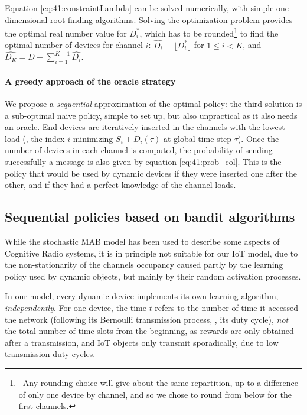 Equation \eqref{eq:41:constraintLambda} can be solved numerically, with simple one-dimensional root finding algorithms.
Solving the optimization problem provides the optimal real number value for $D_i^*$, which has to be rounded\footnote{~Any rounding choice will give about the same repartition, up-to a difference of only one device by channel, and so we chose to round from below for the first channels.} to find the optimal number of devices for channel $i$:
%
$\widehat{D_i} = \lfloor D_i^* \rfloor$ for $1 \leq i < K$, and $\widehat{D_{K}} = D - \sum_{i=1}^{K - 1} \widehat{D_i}$.

\paragraph{A greedy approach of the oracle strategy}

We propose a \emph{sequential} approximation of the optimal policy:
the third solution is a sub-optimal naive policy, simple to set up, but also unpractical as it also needs an oracle.
End-devices are iteratively inserted in the channels with the lowest load (\ie, the index $i$ minimizing $S_i + D_i(\tau)$ at global time step $\tau$). Once the number of devices in each channel is computed, the probability of sending successfully a message is also given by equation \eqref{eq:41:prob_col}.
This is the policy that would be used by dynamic devices if they were inserted one after the other, and if they had a perfect knowledge of the channel loads.


\subsection{Sequential policies based on bandit algorithms}
\label{sub:41:sequentialPolicies}

While the stochastic MAB model has been used to describe some aspects of Cognitive Radio systems, it is in principle not suitable for our IoT model, due to the non-stationarity of the channels occupancy caused partly by the learning policy used by dynamic objects, but mainly by their random activation processes.

In our model, every dynamic device implements its own learning algorithm, \emph{independently}.
For one device, the time $t$ refers to the number of time it accessed the network (following its Bernoulli transmission process, \ie, its duty cycle), \emph{not} the total number of time slots from the beginning, as rewards are only obtained after a transmission, and IoT objects only transmit sporadically, due to low transmission duty cycles.


